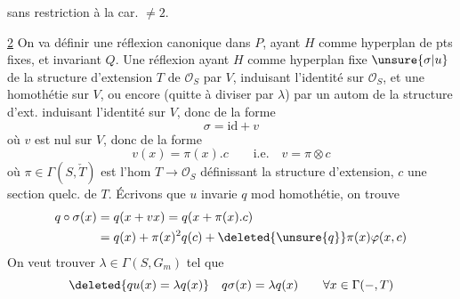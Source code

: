 sans restriction à la car. $\ne2$.

\uline{2} \quad On va définir une réflexion canonique dans $P$, ayant $H$ comme hyperplan de pts fixes, et invariant $Q$. Une  réflexion  ayant $H$ comme hyperplan fixe   $\unsure{\sigma|u}$ de la structure d'extension  $T$ de $\mathcal O_S$ par $V$,  induisant l'identité sur $\mathcal O_S$, et une homothétie  sur $V$, ou encore (quitte à diviser par $\lambda$\deleted{\unsure{\varphi}}) par un autom de la structure d'ext. induisant l'identité sur $V$, donc de la forme
\[
\sigma=\mathrm{id}+v
\]
où $v$ est nul sur $V$, donc de la forme
\[
v(x)=\pi(x).c\qquad\text{i.e.}\quad v=\pi\otimes c
\]
où $\pi\in\Gamma(S,\check T)$ est l'hom $T\longrightarrow\mathcal O_S$ définissant la structure d'extension, $c$ une section quelc. de $T$. Écrivons que  $u$ invarie $q$ mod homothétie, on trouve
\[
\begin{aligned}
q\circ\sigma(x)&=q(x+vx)=q(x+\pi(x).c)\\
&=q(x)+\pi(x)^2q(c)+\deleted{\unsure{q}}\pi(x)\varphi(x,c)
\end{aligned}
\]
On veut trouver $\lambda\in\Gamma(S,G_m)$ tel que
\[
\deleted{qu(x)=\lambda q(x)}\quad q\sigma(x)=\lambda q(x)\qquad\forall x\in\Gamma(-,T)
\]
